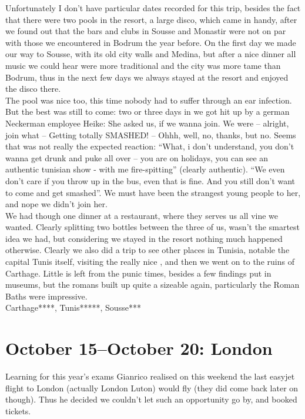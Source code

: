 Unfortunately I don't have particular dates recorded for this trip, besides the fact that there were two pools in the resort, a large disco, which came in handy, after we found out that the bars and clubs in Sousse and Monastir were not on par with those we encountered in Bodrum the year before. On the first day we made our way to Sousse, with its old city walls and Medina, but after a nice dinner all music we could hear were more traditional and the city was more tame than Bodrum, thus in the next few days we always stayed at the resort and enjoyed the disco there.\\
The pool was nice too, this time nobody had to suffer through an ear infection. But the best was still to come: two or three days in we got hit up by a german Neckerman employee Heike: She asked us, if we wanna join. We were -- alright, join what -- Getting totally SMASHED! -- Ohhh, well, no, thanks, but no. Seems that was not really the expected reaction: ``What, i don't understand, you don't wanna get drunk and puke all over -- you are on holidays, you can see an authentic tunisian show - with me fire-spitting'' (clearly authentic). ``We even don't care if you throw up in the bus, even that is fine. And you still don't want to come and get smashed''. We must have been the strangest young people to her, and nope we didn't join her.\\
We had though one dinner at a restaurant, where they serves us all vine we wanted. Clearly splitting two bottles between the three of us, wasn't the smartest idea we had, but considering we stayed in the resort nothing much happened otherwise. Clearly we also did a trip to see other places in Tunisia, notable the capital Tunis itself, visiting the really nice , and then we went on to the ruins of Carthage. Little is left from the punic times, besides a few findings put in museums, but the romans built up quite a sizeable again, particularly the Roman Baths were impressive.\\

Carthage****, Tunis*****, Sousse***

\section{October 15--October 20: London}
\label{2004:London}

Learning for this year's exams Gianrico realised on this weekend the last easyjet flight to London (actually London Luton) would fly (they did come back later on though). Thus he decided we couldn't let such an opportunity go by, and booked tickets.\\

